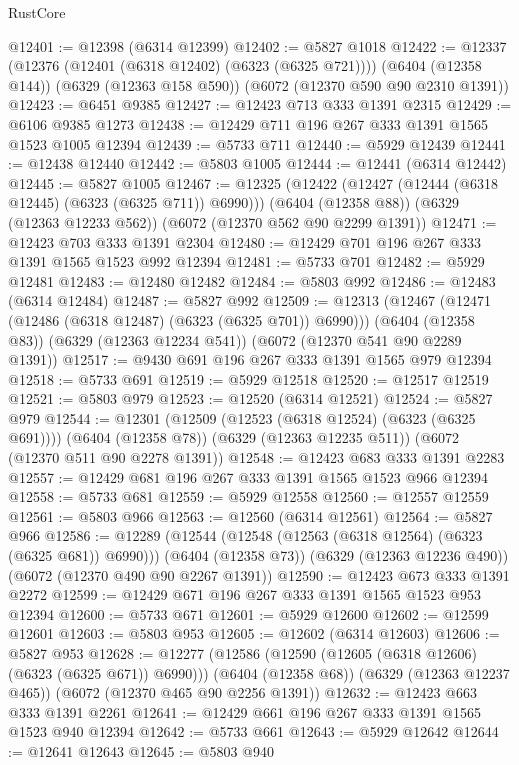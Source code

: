 \begin{lexlean}{RustCore}
\begin{coremodule}
@12401 := @12398 (@6314 @12399)
@12402 := @5827 @1018
@12422 := @12337
    (@12376 (@12401 (@6318 @12402) (@6323 (@6325 @721))))
    (@6404 (@12358 @144))
    (@6329 (@12363 @158 @590))
    (@6072 (@12370 @590 @90 @2310 @1391))
@12423 := @6451 @9385
@12427 := @12423 @713 @333 @1391 @2315
@12429 := @6106 @9385 @1273
@12438 := @12429 @711 @196 @267 @333 @1391 @1565 @1523 @1005 @12394
@12439 := @5733 @711
@12440 := @5929 @12439
@12441 := @12438 @12440
@12442 := @5803 @1005
@12444 := @12441 (@6314 @12442)
@12445 := @5827 @1005
@12467 := @12325
    (@12422 (@12427 (@12444 (@6318 @12445) (@6323 (@6325 @711)) @6990)))
    (@6404 (@12358 @88))
    (@6329 (@12363 @12233 @562))
    (@6072 (@12370 @562 @90 @2299 @1391))
@12471 := @12423 @703 @333 @1391 @2304
@12480 := @12429 @701 @196 @267 @333 @1391 @1565 @1523 @992 @12394
@12481 := @5733 @701
@12482 := @5929 @12481
@12483 := @12480 @12482
@12484 := @5803 @992
@12486 := @12483 (@6314 @12484)
@12487 := @5827 @992
@12509 := @12313
    (@12467 (@12471 (@12486 (@6318 @12487) (@6323 (@6325 @701)) @6990)))
    (@6404 (@12358 @83))
    (@6329 (@12363 @12234 @541))
    (@6072 (@12370 @541 @90 @2289 @1391))
@12517 := @9430 @691 @196 @267 @333 @1391 @1565 @979 @12394
@12518 := @5733 @691
@12519 := @5929 @12518
@12520 := @12517 @12519
@12521 := @5803 @979
@12523 := @12520 (@6314 @12521)
@12524 := @5827 @979
@12544 := @12301
    (@12509 (@12523 (@6318 @12524) (@6323 (@6325 @691))))
    (@6404 (@12358 @78))
    (@6329 (@12363 @12235 @511))
    (@6072 (@12370 @511 @90 @2278 @1391))
@12548 := @12423 @683 @333 @1391 @2283
@12557 := @12429 @681 @196 @267 @333 @1391 @1565 @1523 @966 @12394
@12558 := @5733 @681
@12559 := @5929 @12558
@12560 := @12557 @12559
@12561 := @5803 @966
@12563 := @12560 (@6314 @12561)
@12564 := @5827 @966
@12586 := @12289
    (@12544 (@12548 (@12563 (@6318 @12564) (@6323 (@6325 @681)) @6990)))
    (@6404 (@12358 @73))
    (@6329 (@12363 @12236 @490))
    (@6072 (@12370 @490 @90 @2267 @1391))
@12590 := @12423 @673 @333 @1391 @2272
@12599 := @12429 @671 @196 @267 @333 @1391 @1565 @1523 @953 @12394
@12600 := @5733 @671
@12601 := @5929 @12600
@12602 := @12599 @12601
@12603 := @5803 @953
@12605 := @12602 (@6314 @12603)
@12606 := @5827 @953
@12628 := @12277
    (@12586 (@12590 (@12605 (@6318 @12606) (@6323 (@6325 @671)) @6990)))
    (@6404 (@12358 @68))
    (@6329 (@12363 @12237 @465))
    (@6072 (@12370 @465 @90 @2256 @1391))
@12632 := @12423 @663 @333 @1391 @2261
@12641 := @12429 @661 @196 @267 @333 @1391 @1565 @1523 @940 @12394
@12642 := @5733 @661
@12643 := @5929 @12642
@12644 := @12641 @12643
@12645 := @5803 @940

\end{coremodule}
\end{lexlean}
